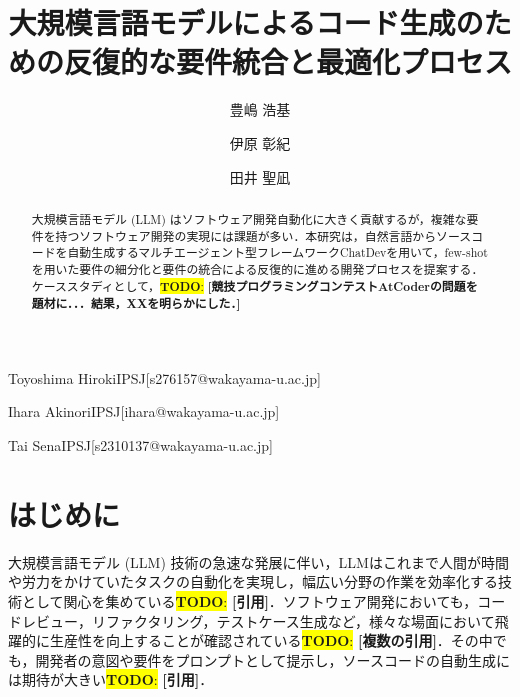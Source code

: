 \documentclass[submit,techrep,noauthor]{ipsj}
\newcommand{\todo}[1]{\colorbox{yellow}{{\bf TODO}:}{\color{red} {\textbf{[#1]}}}}
\begin{document}
\title{大規模言語モデルによるコード生成のための反復的な要件統合と最適化プロセス\\}




\author{豊嶋 浩基}{Toyoshima Hiroki}{IPSJ}[s276157@wakayama-u.ac.jp]
\author{伊原 彰紀}{Ihara Akinori}{IPSJ}[ihara@wakayama-u.ac.jp]
\author{田井 聖凪}{Tai Sena}{IPSJ}[s2310137@wakayama-u.ac.jp]

\begin{abstract}
大規模言語モデル (LLM) はソフトウェア開発自動化に大きく貢献するが，複雑な要件を持つソフトウェア開発の実現には課題が多い．本研究は，自然言語からソースコードを自動生成するマルチエージェント型フレームワークChatDevを用いて，few-shotを用いた要件の細分化と要件の統合による反復的に進める開発プロセスを提案する．ケーススタディとして，\todo{競技プログラミングコンテストAtCoderの問題を題材に．．．結果，XXを明らかにした．}
\end{abstract}

\maketitle

\section{はじめに}

大規模言語モデル (LLM) 技術の急速な発展に伴い，LLMはこれまで人間が時間や労力をかけていたタスクの自動化を実現し，幅広い分野の作業を効率化する技術として関心を集めている\todo{引用}．ソフトウェア開発においても，コードレビュー，リファクタリング，テストケース生成など，様々な場面において飛躍的に生産性を向上することが確認されている\todo{複数の引用}．その中でも，開発者の意図や要件をプロンプトとして提示し，ソースコードの自動生成には期待が大きい\todo{引用}．
\end{document}
